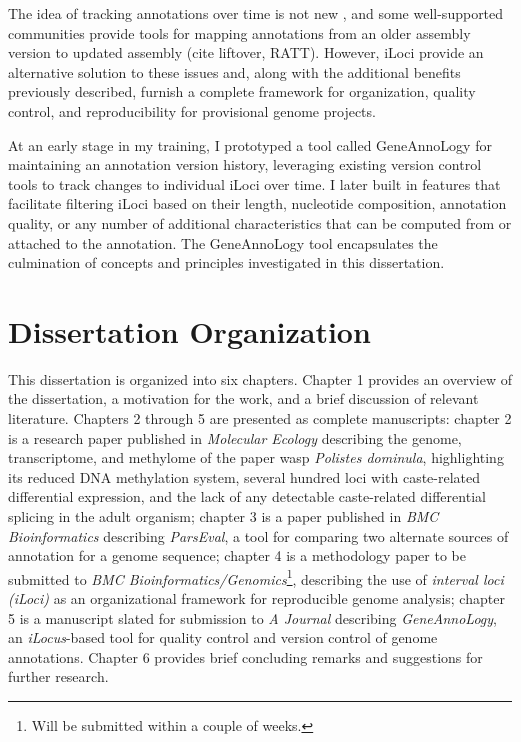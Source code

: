 The idea of tracking annotations over time is not new \cite{Eilbeck}, and some well-supported communities provide tools for mapping annotations from an older assembly version to updated assembly (cite liftover, RATT).
However, iLoci provide an alternative solution to these issues and, along with the additional benefits previously described, furnish a complete framework for organization, quality control, and reproducibility for provisional genome projects.

At an early stage in my training, I prototyped a tool called GeneAnnoLogy for maintaining an annotation version history, leveraging existing version control tools to track changes to individual iLoci over time.
I later built in features that facilitate filtering iLoci based on their length, nucleotide composition, annotation quality, or any number of additional characteristics that can be computed from or attached to the annotation.
The GeneAnnoLogy tool encapsulates the culmination of concepts and principles investigated in this dissertation.

\section{Dissertation Organization}

This dissertation is organized into six chapters.
Chapter 1 provides an overview of the dissertation, a motivation for the work, and a brief discussion of relevant literature.
Chapters 2 through 5 are presented as complete manuscripts:
chapter 2 is a research paper published in \textit{Molecular Ecology} describing the genome, transcriptome, and methylome of the paper wasp \textit{Polistes dominula}, highlighting its reduced DNA methylation system, several hundred loci with caste-related differential expression, and the lack of any detectable caste-related differential splicing in the adult organism;
chapter 3 is a paper published in \textit{BMC Bioinformatics} describing \textit{ParsEval}, a tool for comparing two alternate sources of annotation for a genome sequence;
chapter 4 is a methodology paper to be submitted to \textit{BMC Bioinformatics/Genomics}\footnote{Will be submitted within a couple of weeks.}, describing the use of \textit{interval loci (iLoci)} as an organizational framework for reproducible genome analysis;
chapter 5 is a manuscript slated for submission to \textit{A Journal} describing \textit{GeneAnnoLogy}, an \textit{iLocus}-based tool for quality control and version control of genome annotations.
Chapter 6 provides brief concluding remarks and suggestions for further research.
